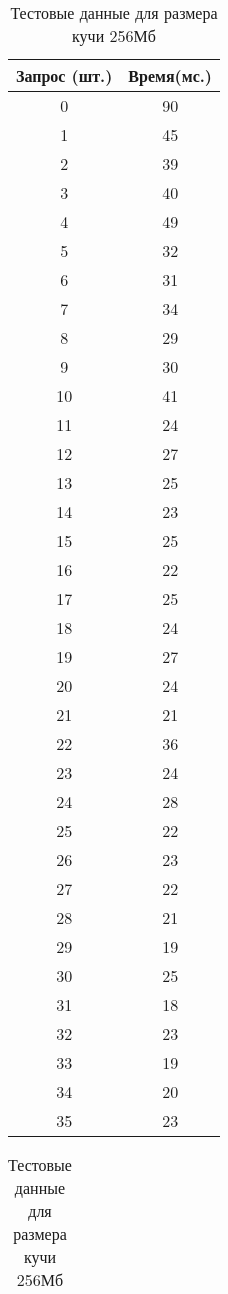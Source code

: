   \begin{table}[H]
	\begin{minipage}{.4\textwidth}
		\centering
		\caption{Тестовые данные для размера кучи 256Мб}
		\begin{tabular}{|c|c|}
			\hline
			Запрос (шт.) & Время(мс.) \\
			\hline
			0   & 90 \\
			1   & 45 \\
			2   & 39 \\
			3   & 40 \\
			4   & 49 \\
			5   & 32 \\
			6   & 31 \\
			7   & 34 \\
			8   & 29 \\
			9   & 30 \\
			10  & 41 \\
			11  & 24 \\
			12  & 27 \\
			13  & 25 \\
			14  & 23 \\
			15  & 25 \\
			16  & 22 \\
			17  & 25 \\
			18  & 24 \\
			19  & 27 \\
			20  & 24 \\
			21  & 21 \\
			22  & 36 \\
			23  & 24 \\
			24  & 28 \\
			25  & 22 \\
			26  & 23 \\
			27  & 22 \\
			28  & 21 \\
			29  & 19 \\
			30  & 25 \\
			31  & 18 \\
			32  & 23 \\
			33  & 19 \\
			34  & 20 \\
			35  & 23 \\
			\hline
		\end{tabular}
	\end{minipage}
\hfill
	\begin{minipage}{.4\textwidth}
		\centering
		\caption{Тестовые данные для размера кучи 256Мб}
		\begin{tabular}{|c|c|}

\end{tabular}
\end{minipage}
\end{table}
